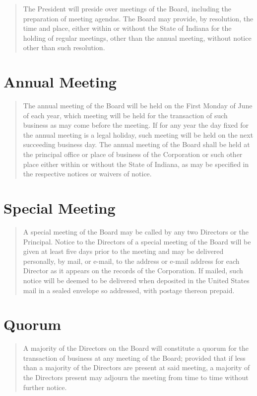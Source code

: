 \documentclass[
]{book}
\begin{document}
\begin{quote}
The President will preside over meetings of the Board, including the
preparation of meeting agendas. The Board may provide, by resolution,
the time and place, either within or without the State of Indiana for
the holding of regular meetings, other than the annual meeting,
without notice other than such resolution.
\end{quote}

\section{Annual Meeting}\label{annual-meeting}

\begin{quote}
The annual meeting of the Board will be held on the First Monday of
June of each year, which meeting will be held for the transaction of
such business as may come before the meeting. If for any year the day
fixed for the annual meeting is a legal holiday, such meeting will be
held on the next succeeding business day. The annual meeting of the
Board shall be held at the principal office or place of business of
the Corporation or such other place either within or without the State
of Indiana, as may be specified in the respective notices or waivers
of notice.
\end{quote}

\section{Special Meeting}\label{special-meeting}

\begin{quote}
A special meeting of the Board may be called by any two Directors or
the Principal. Notice to the Directors of a special meeting of the
Board will be given at least five days prior to the meeting and may be
delivered personally, by mail, or e-mail, to the address or e-mail
address for each Director as it appears on the records of the
Corporation. If mailed, such notice will be deemed to be delivered
when deposited in the United States mail in a sealed envelope so
addressed, with postage thereon prepaid.
\end{quote}

\section{Quorum}\label{quorum}

\begin{quote}
A majority of the Directors on the Board will constitute a quorum for
the transaction of business at any meeting of the Board; provided that
if less than a majority of the Directors are present at said meeting,
a majority of the Directors present may adjourn the meeting from time
to time without further notice.
\end{quote}
\end{document}
